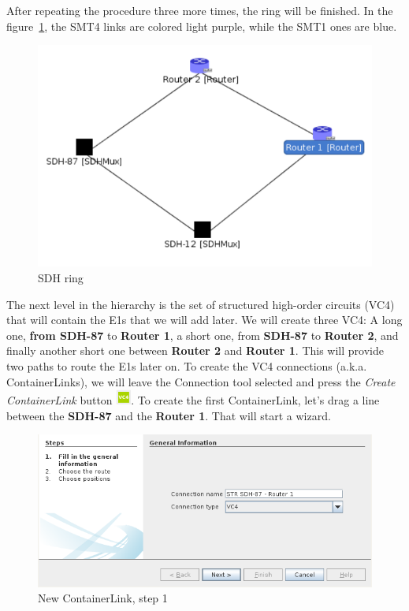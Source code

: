 \documentclass[a4paper]{article}
\begin{document}
		After repeating the procedure three more times, the ring will be finished. In the figure~\ref{fig:sdh_module_ring}, the SMT4 links are colored light purple, while the SMT1 ones are blue.
		\begin{figure}[h!]
			\centering
			\includegraphics[width=0.7\linewidth]{img/sdh_module_ring.png}
			\caption{SDH ring}
			\label{fig:sdh_module_ring}
		\end{figure}
		\newpage
		The next level in the hierarchy is the set of structured high-order circuits (VC4) that will contain the E1s that we will add later. We will create three VC4: A long one, \textbf{from SDH-87} to \textbf{Router 1}, a short one, from \textbf{SDH-87} to \textbf{Router 2}, and finally another short one between \textbf{Router 2} and \textbf{Router 1}. This will provide two paths to route the E1s later on. To create the VC4 connections (a.k.a. ContainerLinks), we will leave the Connection tool selected and press the \textit{Create ContainerLink} button \includegraphics[width=0.5cm]{img/sdh_module_container_link.png}. To create the first ContainerLink, let's drag a line between the \textbf{SDH-87} and the \textbf{Router 1}. That will start a wizard.
		\begin{figure}[h!]
			\centering
			\includegraphics[width=\linewidth]{img/sdh_module_container_link_step_1.png}
			\caption{New ContainerLink, step 1}
			\label{fig:sdh_module_container_link_step_1}
		\end{figure}
		
\end{document}
